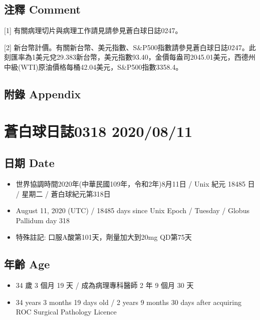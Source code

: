 \documentclass[a5paper, 11pt
]{book}
\providecommand{\tightlist}{%
  \setlength{\itemsep}{0pt}\setlength{\parskip}{0pt}}
\begin{document}
\hypertarget{ux6ce8ux91cb-comment-70}{%
\subsection{注釋 Comment}\label{ux6ce8ux91cb-comment-70}}

{[}1{]} 有關病理切片與病理工作請見請參見蒼白球日誌0247。

{[}2{]}
新台幣計價。有關新台幣、美元指數、S\&P500指數請參見蒼白球日誌0247。此刻匯率為1美元兌29.383新台幣，美元指數93.40，金價每盎司2045.01美元，西德州中級(WTI)原油價格每桶42.04美元，S\&P500指數3358.4。

\hypertarget{ux9644ux9304-appendix-70}{%
\subsection{附錄 Appendix}\label{ux9644ux9304-appendix-70}}

\hypertarget{ux84bcux767dux7403ux65e5ux8a8c0318-20200811}{%
\section{蒼白球日誌0318
2020/08/11}\label{ux84bcux767dux7403ux65e5ux8a8c0318-20200811}}

\hypertarget{ux65e5ux671f-date-71}{%
\subsection{日期 Date}\label{ux65e5ux671f-date-71}}

\begin{itemize}
\tightlist
\item
  世界協調時間2020年(中華民國109年，令和2年)8月11日 / Unix 紀元 18485 日
  / 星期二 / 蒼白球紀元第318日
\item
  August 11, 2020 (UTC) / 18485 days since Unix Epoch / Tuesday / Globus
  Pallidum day 318
\item
  特殊註記: 口服A酸第101天，劑量加大到20mg QD第75天
\end{itemize}

\hypertarget{ux5e74ux9f61-age-71}{%
\subsection{年齡 Age}\label{ux5e74ux9f61-age-71}}

\begin{itemize}
\tightlist
\item
  34 歲 3 個月 19 天 / 成為病理專科醫師 2 年 9 個月 30 天
\item
  34 years 3 months 19 days old / 2 years 9 months 30 days after
  acquiring ROC Surgical Pathology Licence
\end{itemize}
\end{document}
